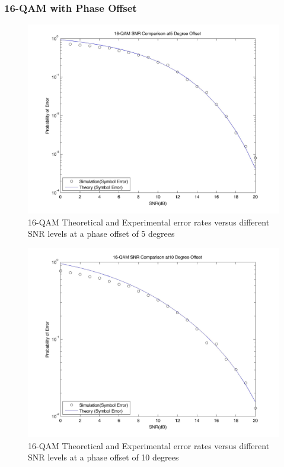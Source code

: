 \documentclass[]{article}
\begin{document}
\subsubsection{16-QAM with Phase Offset}
\label{sec:qam16_phase}
\begin{figure}[H]
\centering
\hspace*{-2cm}\includegraphics[width=1.3\textwidth]{qam16SNRpo1.jpg}
\caption{16-QAM Theoretical and Experimental error rates versus different SNR levels at a phase offset of 5 degrees }
\end{figure}

\begin{figure}[H]
\centering
\hspace*{-2cm}\includegraphics[width=1.3\textwidth]{qam16SNRpo2.jpg}
\caption{16-QAM Theoretical and Experimental error rates versus different SNR levels at a phase offset of 10 degrees }
\end{figure}
\end{document}
